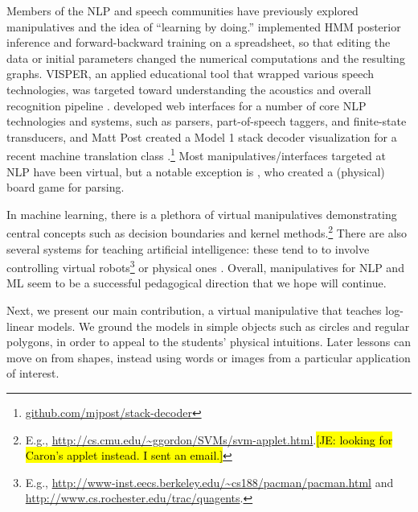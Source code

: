 \documentclass[11pt,letterpaper]{article}
\newcommand{\Note}[1]{}
\renewcommand{\Note}[1]{\hl{[#1]}}  %
\newcommand{\NoteSigned}[3]{{\sethlcolor{#2}\Note{#1: #3}}}
\newcommand{\NoteJE}[1]{\NoteSigned{JE}{LightGreen}{#1}}
\newcommand{\Commented}[1]{#1}
\begin{document}

Members of the NLP and speech communities have previously explored manipulatives and the idea of
``learning by doing.''
 implemented HMM posterior inference and
forward-backward training on a spreadsheet, so that editing the data or initial parameters
changed the numerical computations and the resulting graphs.  
VISPER, an applied educational tool that wrapped various speech technologies, 
was targeted toward understanding the acoustics and overall recognition pipeline 
\cite{nouza1997educational,nouza1999teaching} . 
 developed web interfaces for a number of core NLP technologies and systems, such as parsers, part-of-speech 
taggers, and finite-state transducers, and Matt Post created a Model 1 stack decoder visualization for a recent machine translation class \cite{lopez2013learning}.\footnote{\url{github.com/mjpost/stack-decoder}}
Most manipulatives/interfaces targeted at NLP have been virtual, but a notable exception is , 
who created a (physical) board game for parsing. 

In machine learning, there is a plethora of virtual manipulatives demonstrating central concepts such 
as decision boundaries and kernel
methods.\footnote{E.g.,
  \url{http://cs.cmu.edu/~ggordon/SVMs/svm-applet.html}.\NoteJE{looking
  for Caron's applet instead.  I sent an email.}}
There are also several systems for teaching artificial intelligence: these tend to to involve controlling 
virtual robots\footnote{E.g., \url{http://www-inst.eecs.berkeley.edu/~cs188/pacman/pacman.html} and 
\url{http://www.cs.rochester.edu/trac/quagents}.}
or physical ones \cite{tokic2012robot}.
Overall, manipulatives for NLP and ML seem to be a successful
pedagogical direction that we hope will continue.

Next, we present our main contribution, a virtual manipulative that teaches log-linear models. We ground 
the models in simple objects such as circles and regular polygons, in order to appeal to the 
students' physical intuitions.  Later lessons can move on 
from shapes, instead using words or images from a particular
application of interest.
\end{document}
